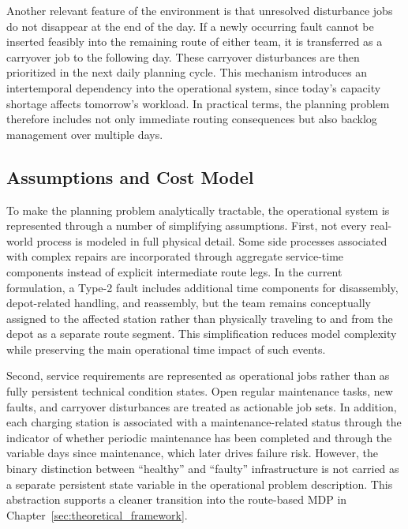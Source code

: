 \documentclass[12pt,oneside]{article}
\begin{document}
Another relevant feature of the environment is that unresolved disturbance jobs do not disappear at the end of the day. If a newly occurring fault cannot be inserted feasibly into the remaining route of either team, it is transferred as a carryover job to the following day. These carryover disturbances are then prioritized in the next daily planning cycle. This mechanism introduces an intertemporal dependency into the operational system, since today’s capacity shortage affects tomorrow’s workload. In practical terms, the planning problem therefore includes not only immediate routing consequences but also backlog management over multiple days.
\subsection{Assumptions and Cost Model}\label{subsec_assumptions_and_cost_model}
To make the planning problem analytically tractable, the operational system is represented through a number of simplifying assumptions. First, not every real-world process is modeled in full physical detail. Some side processes associated with complex repairs are incorporated through aggregate service-time components instead of explicit intermediate route legs. In the current formulation, a Type-2 fault includes additional time components for disassembly, depot-related handling, and reassembly, but the team remains conceptually assigned to the affected station rather than physically traveling to and from the depot as a separate route segment. This simplification reduces model complexity while preserving the main operational time impact of such events.

Second, service requirements are represented as operational jobs rather than as fully persistent technical condition states. Open regular maintenance tasks, new faults, and carryover disturbances are treated as actionable job sets. In addition, each charging station is associated with a maintenance-related status through the indicator of whether periodic maintenance has been completed and through the variable days since maintenance, which later drives failure risk. However, the binary distinction between “healthy” and “faulty” infrastructure is not carried as a separate persistent state variable in the operational problem description. This abstraction supports a cleaner transition into the route-based MDP in Chapter~\ref{sec:theoretical_framework}.
\end{document}
